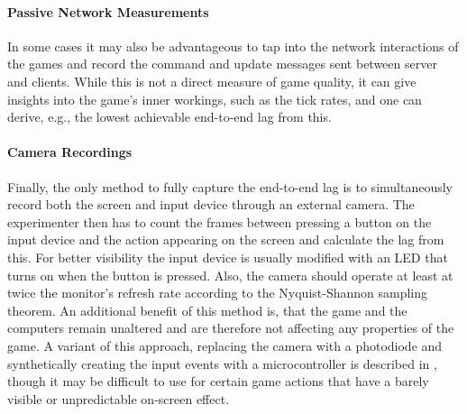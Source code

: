 \paragraph{Passive Network Measurements}
In some cases it may also be advantageous to tap into the network interactions of the games and record the command and update messages sent between server and clients. While this is not a direct measure of game quality, it can give insights into the game's inner workings, such as the tick rates, and one can derive, e.g., the lowest achievable end-to-end lag from this.




\paragraph{Camera Recordings}
Finally, the only method to fully capture the end-to-end lag is to simultaneously record both the screen and input device through an external camera. The experimenter then has to count the frames between pressing a button on the input device and the action appearing on the screen and calculate the lag from this. For better visibility the input device is usually modified with an LED that turns on when the button is pressed. Also, the camera should operate at least at twice the monitor's refresh rate according to the Nyquist-Shannon sampling theorem. An additional benefit of this method is, that the game and the computers remain unaltered and are therefore not affecting any properties of the game. A variant of this approach, replacing the camera with a photodiode and synthetically creating the input events with a microcontroller is described in \cite{beyermethod}, though it may be difficult to use for certain game actions that have a barely visible or unpredictable on-screen effect.




